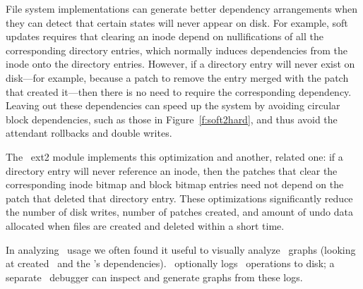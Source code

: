 File system implementations can generate better dependency arrangements
when they can detect that certain states will never appear on disk.
%
For example, soft updates requires that clearing an inode
depend on nullifications of all the corresponding directory entries, which
normally induces dependencies from the inode onto the directory
entries.
%
However, if a directory entry will never exist on disk---for example,
because a patch to remove the entry merged with the patch that created
it---then there is no need to require the corresponding dependency.
%
Leaving out these dependencies can speed up the system by avoiding circular
block dependencies, such as those in Figure~\ref{f:soft2hard}, and thus
avoid the attendant rollbacks and double writes.
%
\begin{comment}
A dependency from the inode clear onto the directory entry clear is
sufficient to ensure this property. However, when a directory entry
will never exist on disk because it is created and removed before the
creation is committed, the inode clear need not depend on the
directory entry clear.
\end{comment}
%
The \Kudos\ ext2 module implements this optimization and another, related
one: if a directory entry will never reference an inode, then the patches
that clear the corresponding inode bitmap and block bitmap entries need not
depend on the patch that deleted that directory entry.
%
These optimizations significantly reduce the number of disk writes, number
of patches created, and amount of undo data allocated when files are
created and deleted within a short time.

In analyzing \patch\ usage we often found it useful to visually
analyze \patch\ graphs (looking at created \patches\ and the \patch's
dependencies). \Kudos\ optionally logs \patch\ operations to disk;
a separate \Kudos\ debugger can inspect and generate graphs from these
logs.



